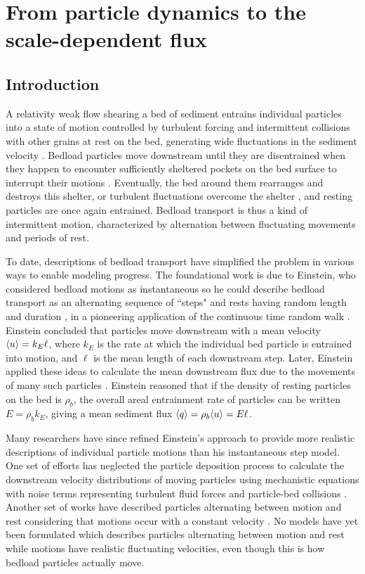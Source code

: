 
\chapter{From particle dynamics to the scale-dependent flux}
\label{ch:flux}
\section{Introduction}

A relativity weak flow shearing a bed of sediment entrains individual particles into a state of motion controlled by turbulent forcing and intermittent collisions with other grains at rest on the bed, generating wide fluctuations in the sediment velocity \citep{Heyman2016,Fathel2015}.
Bedload particles move downstream until they are disentrained when they happen to encounter sufficiently sheltered pockets on the bed surface to interrupt their motions \citep{Charru2004,Gordon1972}.
Eventually, the bed around them rearranges and destroys this shelter, or turbulent fluctuations overcome the shelter \citep{Celik2014,Valyrakis2010}, and resting particles are once again entrained.
Bedload transport is thus a kind of intermittent motion, characterized by alternation between fluctuating movements and periods of rest.

To date, descriptions of bedload transport have simplified the problem in various ways to enable modeling progress.
The foundational work is due to Einstein, who considered bedload motions as instantaneous so he could describe bedload transport as an alternating sequence of ``steps" and rests having random length and duration \citep{Einstein1937}, in a pioneering application of the continuous time random walk \citep{Montroll1965}.
Einstein concluded that particles move downstream with a mean velocity $\langle u \rangle = k_E \ell$, where $k_E$ is the rate at which the individual bed particle is entrained into motion, and $\ell$ is the mean length of each downstream step.
Later, Einstein applied these ideas to calculate the mean downstream flux due to the movements of many such particles \citep{Einstein1950}. Einstein reasoned that if the density of resting particles on the bed is $\rho_b$, the overall areal entrainment rate of particles can be written $E = \rho_b k_E$, giving a mean sediment flux $\langle q \rangle = \rho_b \langle u \rangle  = E \ell $.

Many researchers have since refined Einstein's approach to provide more realistic descriptions of individual particle motions than his instantaneous step model.
One set of efforts has neglected the particle deposition process to calculate the downstream velocity distributions of moving particles using mechanistic equations with noise terms representing turbulent fluid forces and particle-bed collisions \citep{Ancey2014,Fan2014}. 
Another set of works have described particles alternating between motion and rest considering that motions occur with a constant velocity \citep{Lisle1998,Lajeunesse2017}. 
No models have yet been formulated which describes particles alternating between motion and rest while motions have realistic fluctuating velocities, even though this is how bedload particles actually move.

